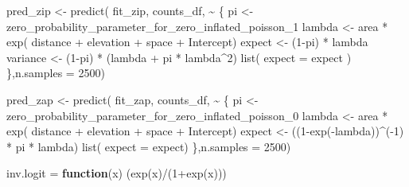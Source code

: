 \documentclass[
  letterpaper,
  DIV=11,
  numbers=noendperiod]{scrartcl}
\newenvironment{Shaded}{\begin{snugshade}}{\end{snugshade}}
\newcommand{\AttributeTok}[1]{\textcolor[rgb]{0.40,0.45,0.13}{#1}}
\newcommand{\ControlFlowTok}[1]{\textcolor[rgb]{0.00,0.23,0.31}{\textbf{#1}}}
\newcommand{\DecValTok}[1]{\textcolor[rgb]{0.68,0.00,0.00}{#1}}
\newcommand{\FunctionTok}[1]{\textcolor[rgb]{0.28,0.35,0.67}{#1}}
\newcommand{\NormalTok}[1]{\textcolor[rgb]{0.00,0.23,0.31}{#1}}
\newcommand{\OtherTok}[1]{\textcolor[rgb]{0.00,0.23,0.31}{#1}}
\newcommand{\SpecialCharTok}[1]{\textcolor[rgb]{0.37,0.37,0.37}{#1}}
\begin{document}
\begin{Shaded}
\begin{Highlighting}[]
\NormalTok{pred\_zip }\OtherTok{\textless{}{-}} \FunctionTok{predict}\NormalTok{(}
\NormalTok{  fit\_zip, }
\NormalTok{  counts\_df,}
  \SpecialCharTok{\textasciitilde{}}\NormalTok{ \{}
\NormalTok{    pi }\OtherTok{\textless{}{-}}\NormalTok{ zero\_probability\_parameter\_for\_zero\_inflated\_poisson\_1}
\NormalTok{    lambda }\OtherTok{\textless{}{-}}\NormalTok{ area }\SpecialCharTok{*} \FunctionTok{exp}\NormalTok{( distance }\SpecialCharTok{+}\NormalTok{ elevation }\SpecialCharTok{+}\NormalTok{ space }\SpecialCharTok{+}\NormalTok{ Intercept)}
\NormalTok{    expect }\OtherTok{\textless{}{-}}\NormalTok{ (}\DecValTok{1}\SpecialCharTok{{-}}\NormalTok{pi) }\SpecialCharTok{*}\NormalTok{ lambda}
\NormalTok{    variance }\OtherTok{\textless{}{-}}\NormalTok{ (}\DecValTok{1}\SpecialCharTok{{-}}\NormalTok{pi) }\SpecialCharTok{*}\NormalTok{ (lambda }\SpecialCharTok{+}\NormalTok{ pi }\SpecialCharTok{*}\NormalTok{ lambda}\SpecialCharTok{\^{}}\DecValTok{2}\NormalTok{)}
    \FunctionTok{list}\NormalTok{(}
      \AttributeTok{expect =}\NormalTok{ expect}
\NormalTok{    )}
\NormalTok{  \},}\AttributeTok{n.samples =} \DecValTok{2500}\NormalTok{)}

\NormalTok{pred\_zap }\OtherTok{\textless{}{-}} \FunctionTok{predict}\NormalTok{( fit\_zap, counts\_df,}
  \SpecialCharTok{\textasciitilde{}}\NormalTok{ \{}
\NormalTok{    pi }\OtherTok{\textless{}{-}}\NormalTok{ zero\_probability\_parameter\_for\_zero\_inflated\_poisson\_0}
\NormalTok{    lambda }\OtherTok{\textless{}{-}}\NormalTok{ area }\SpecialCharTok{*} \FunctionTok{exp}\NormalTok{( distance }\SpecialCharTok{+}\NormalTok{ elevation }\SpecialCharTok{+}\NormalTok{ space }\SpecialCharTok{+}\NormalTok{ Intercept)}
\NormalTok{    expect }\OtherTok{\textless{}{-}}\NormalTok{ ((}\DecValTok{1}\SpecialCharTok{{-}}\FunctionTok{exp}\NormalTok{(}\SpecialCharTok{{-}}\NormalTok{lambda))}\SpecialCharTok{\^{}}\NormalTok{(}\SpecialCharTok{{-}}\DecValTok{1}\NormalTok{) }\SpecialCharTok{*}\NormalTok{ pi }\SpecialCharTok{*}\NormalTok{ lambda)}
    \FunctionTok{list}\NormalTok{(}
      \AttributeTok{expect =}\NormalTok{ expect)}
\NormalTok{  \},}\AttributeTok{n.samples =} \DecValTok{2500}\NormalTok{)}

\NormalTok{inv.logit }\OtherTok{=} \ControlFlowTok{function}\NormalTok{(x) (}\FunctionTok{exp}\NormalTok{(x)}\SpecialCharTok{/}\NormalTok{(}\DecValTok{1}\SpecialCharTok{+}\FunctionTok{exp}\NormalTok{(x)))}


\end{Highlighting}
\end{Shaded}
\end{document}
